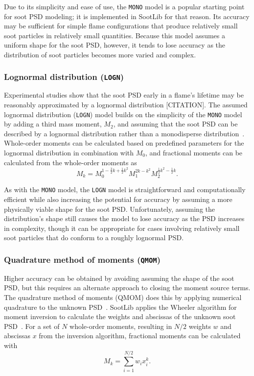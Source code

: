 \documentclass[preprint,letterpaper]{elsarticle}
\begin{document}
Due to its simplicity and ease of use, the \texttt{MONO} model is a popular starting point for soot PSD modeling; it is implemented in SootLib for that reason. Its accuracy may be sufficient for simple flame configurations that produce relatively small soot particles in relatively small quantities. Because this model assumes a uniform shape for the soot PSD, however, it tends to lose accuracy as the distribution of soot particles becomes more varied and complex.

\subsubsection{Lognormal distribution (\texttt{LOGN})}
\label{sss:logn}

Experimental studies show that the soot PSD early in a flame's lifetime may be reasonably approximated by a lognormal distribution [CITATION].
The assumed lognormal distribution (\texttt{LOGN}) model builds on the simplicity of the \texttt{MONO} model by adding a third mass moment, $M_2$, and assuming that the soot PSD can be described by a lognormal distribution rather than a monodisperse distribution~\cite{Lignell_2008b}. Whole-order moments can be calculated based on predefined parameters for the lognormal distribution in combination with $M_0$, and fractional moments can be calculated from the whole-order moments as
\begin{equation}
    M_k = M_0^{1-\frac{3}{2}k+\frac{1}{2}k^2} M_1^{2k-k^2} M_2^{\frac{1}{2}k^2-\frac{1}{2}k}.
\end{equation}

As with the \texttt{MONO} model, the \texttt{LOGN} model is straightforward and computationally efficient while also increasing the potential for accuracy by assuming a more physically viable shape for the soot PSD. Unfortunately, assuming the distribution's shape still causes the model to lose accuracy as the PSD increases in complexity, though it can be appropriate for cases involving relatively small soot particles that do conform to a roughly lognormal PSD.

\subsubsection{Quadrature method of moments (\texttt{QMOM})}
\label{sss:qmom}

Higher accuracy can be obtained by avoiding assuming the shape of the soot PSD, but this requires an alternate approach to closing the moment source terms. The quadrature method of moments (QMOM) does this by applying numerical quadrature to the unknown PSD~\cite{McGraw_1997}. SootLib applies the Wheeler algorithm for moment inversion to calculate the weights and abscissas of the unknown soot PSD~\cite{Marchisio_2013,Wheeler_1974}. For a set of $N$ whole-order moments, resulting in $N/2$ weights $w$ and abscissas $x$ from the inversion algorithm, fractional moments can be calculated with
\begin{equation}
    M_k = \sum_{i=1}^{N/2} w_i x_i^k.
\end{equation}
\end{document}
